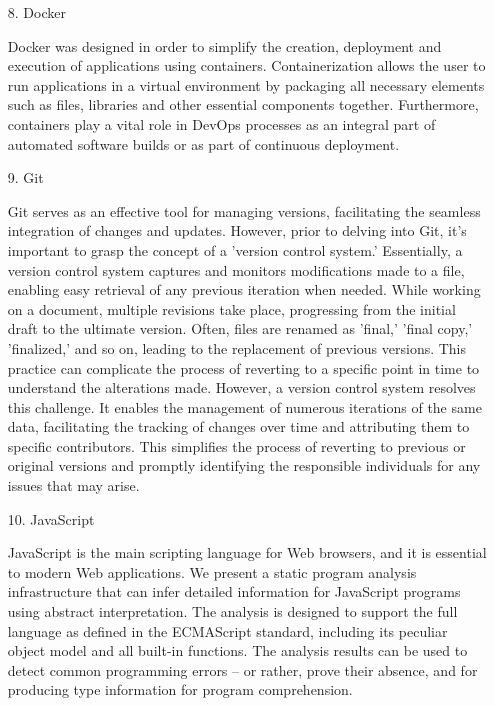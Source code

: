 \documentclass[conference]{IEEEtran}
\begin{document}
\begin{enumerate}
\begin{enumerate}
        \item[8.]Docker
        \item[]Docker was designed in order to simplify the creation, deployment and execution of applications using containers. Containerization allows the user to run applications in a virtual environment by packaging all necessary elements such as files, libraries and other essential components together. Furthermore, containers play a vital role in DevOps processes as an integral part of automated software builds or as part of continuous deployment. \\

        \item[9.]Git \cite{velog-git}
        \item[]Git serves as an effective tool for managing versions, facilitating the seamless integration of changes and updates. However, prior to delving into Git, it's important to grasp the concept of a 'version control system.' Essentially, a version control system captures and monitors modifications made to a file, enabling easy retrieval of any previous iteration when needed. While working on a document, multiple revisions take place, progressing from the initial draft to the ultimate version. Often, files are renamed as 'final,' 'final copy,' 'finalized,' and so on, leading to the replacement of previous versions. This practice can complicate the process of reverting to a specific point in time to understand the alterations made. However, a version control system resolves this challenge. It enables the management of numerous iterations of the same data, facilitating the tracking of changes over time and attributing them to specific contributors. This simplifies the process of reverting to previous or original versions and promptly identifying the responsible individuals for any issues that may arise.\\

        \item[10.]JavaScript \cite{jensen2009type}
        \item[]JavaScript is the main scripting language for Web browsers, and it is essential to modern Web applications. We present a static program analysis infrastructure that can infer detailed information for JavaScript programs using abstract interpretation. The analysis is designed to support the full language as defined in the ECMAScript standard, including its peculiar object model and all built-in functions. The analysis results can be used to detect common programming errors – or rather, prove their absence, and for producing type information for program comprehension.\\


\end{enumerate}
\end{enumerate}
\end{document}

